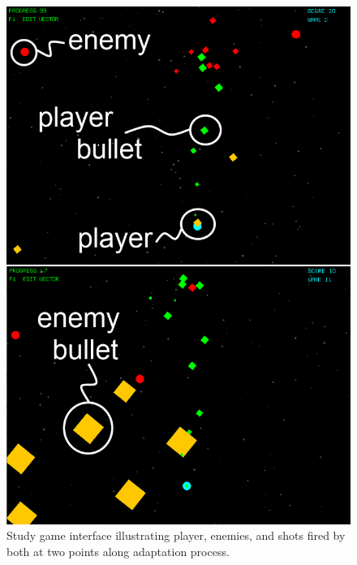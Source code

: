 \documentclass{sig-alternate}
\begin{document}
\begin{figure}[t]
\centering
\includegraphics[width=1\linewidth]{./bullethell_topbybottom_annotated}
\caption{Study game interface illustrating player, enemies, and shots fired by both at two points along adaptation process.}
\label{fig:shmup}
\end{figure}
\end{document}
